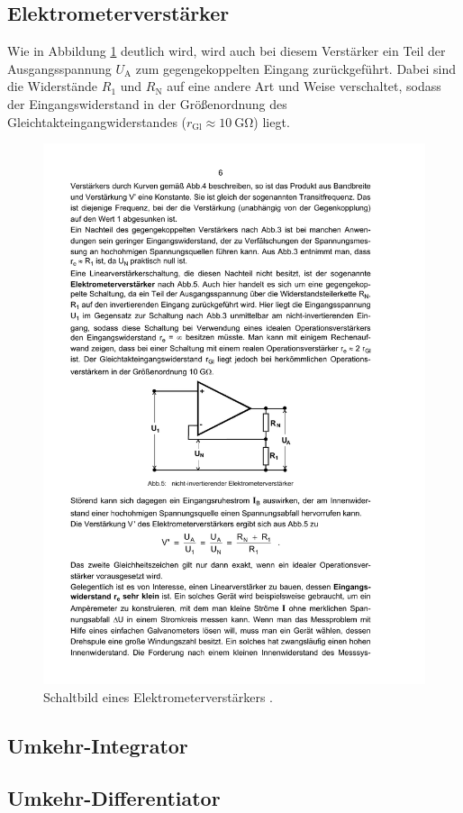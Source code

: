 \subsection{Elektrometerverstärker}
\label{subsec:elektrometerverstärker}
Wie in Abbildung \ref{fig:elektrometer} deutlich wird, wird auch bei diesem
Verstärker ein Teil der Ausgangsspannung $U_\text{A}$ zum gegengekoppelten
Eingang zurückgeführt. Dabei sind die Widerstände $R_1$ und $R_\text{N}$ auf
eine andere Art und Weise verschaltet, sodass der Eingangswiderstand in der
Größenordnung des Gleichtakteingangwiderstandes
($r_\text{Gl} \approx \SI{10}{\giga\ohm}$) liegt.
\begin{figure}
    \centering
    \includegraphics[width=0.7\linewidth]{img/elektrometer.pdf}
    \caption{Schaltbild eines Elektrometerverstärkers \cite{V51}.}
    \label{fig:elektrometer}
\end{figure}

\subsection{Umkehr-Integrator}
\label{subsec:umkehr_integrator}

\subsection{Umkehr-Differentiator}
\label{subsec:umkehr_differentiator}

